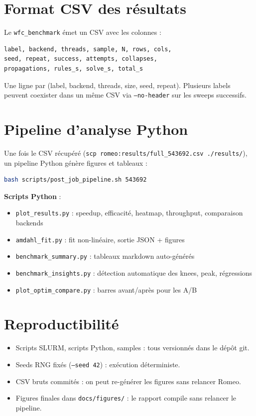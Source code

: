 \section{Format CSV des résultats}
\label{sec:proto:csv}

Le \texttt{wfc\_benchmark} émet un CSV avec les colonnes :
\begin{verbatim}
label, backend, threads, sample, N, rows, cols,
seed, repeat, success, attempts, collapses,
propagations, rules_s, solve_s, total_s
\end{verbatim}

Une ligne par (label, backend, threads, size, seed, repeat). Plusieurs labels peuvent coexister dans un même CSV via \texttt{--no-header} sur les sweeps successifs.

\section{Pipeline d'analyse Python}
\label{sec:proto:pipeline}

Une fois le CSV récupéré (\texttt{scp romeo:results/full\_543692.csv ./results/}), un pipeline Python génère figures et tableaux :

\begin{lstlisting}[language=bash]
bash scripts/post_job_pipeline.sh 543692
\end{lstlisting}

\textbf{Scripts Python} :
\begin{itemize}
    \item \texttt{plot\_results.py} : speedup, efficacité, heatmap, throughput, comparaison backends
    \item \texttt{amdahl\_fit.py} : fit non-linéaire, sortie JSON + figures
    \item \texttt{benchmark\_summary.py} : tableaux markdown auto-générés
    \item \texttt{benchmark\_insights.py} : détection automatique des knees, peak, régressions
    \item \texttt{plot\_optim\_compare.py} : barres avant/après pour les A/B
\end{itemize}

\section{Reproductibilité}
\label{sec:proto:reproductibilite}

\begin{itemize}
    \item Scripts SLURM, scripts Python, samples : tous versionnés dans le dépôt git.
    \item Seeds RNG fixés (\texttt{--seed 42}) : exécution déterministe.
    \item CSV bruts commités : on peut re-générer les figures sans relancer Romeo.
    \item Figures finales dans \texttt{docs/figures/} : le rapport compile sans relancer le pipeline.
\end{itemize}

